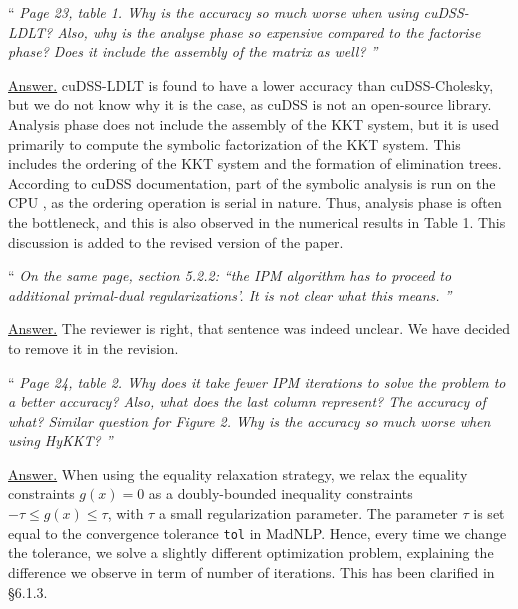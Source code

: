 \documentclass[10pt,a4paper]{article}
\newenvironment{quotereviewer}{\vspace{.5cm}{\underline\reviewername} ``\it\footnotesize}{''}
\newcommand{\answer}{\vspace{1mm}\underline{Answer.} }
\begin{document}
\begin{quotereviewer}
Page 23, table 1. Why is the accuracy so much worse when using cuDSS-LDLT? Also, why is the analyse phase so expensive compared to the factorise phase? Does it include the assembly of the matrix as well?
\end{quotereviewer}

\answer
cuDSS-LDLT is found to have a lower accuracy than cuDSS-Cholesky, but we do not know why it is the case, as cuDSS is not an open-source library. Analysis phase does not include the assembly of the KKT system, but it is used primarily to compute the symbolic factorization of the KKT system. This includes the ordering of the KKT system and the formation of elimination trees. According to cuDSS documentation, part of the symbolic analysis is run on the CPU \cite{nvidiaNVIDIACuDSSPreview}, as the ordering operation is serial in nature. Thus, analysis phase is often the bottleneck, and this is also observed in the numerical results in Table 1. This discussion is added to the revised version of the paper.



\begin{quotereviewer}
On the same page, section 5.2.2: ``the IPM algorithm has to proceed to additional primal-dual regularizations'. It is not clear what this means.
\end{quotereviewer}

\answer
The reviewer is right, that sentence was indeed unclear. We have decided to remove it in the revision.

\begin{quotereviewer}
Page 24, table 2. Why does it take fewer IPM iterations to solve the problem to a better accuracy?
Also, what does the last column represent? The accuracy of what? Similar question for Figure 2. Why is the accuracy so much worse when using HyKKT?
\end{quotereviewer}

\answer When using the equality relaxation strategy, we relax the equality constraints $g(x) = 0$ as
a doubly-bounded inequality constraints $-\tau \leq g(x) \leq \tau$, with $\tau$ a small
regularization parameter. The parameter $\tau$ is set equal to the convergence tolerance {\tt tol}
in MadNLP. Hence, every time we change the tolerance, we solve a slightly different optimization problem,
explaining the difference we observe in term of number of iterations.
This has been clarified in \S 6.1.3.
\end{document}
